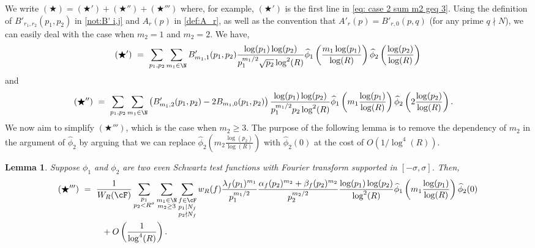 \documentclass[11pt, reqno]{amsart}
\newtheorem{lemma}[theorem]{Lemma}
\theoremstyle{definition}
\theoremstyle{remark}
\numberwithin{equation}{section}
\renewcommand{\hat}{\widehat}
\begin{document}
We write $(\bigstar)=(\bigstar')+(\bigstar'')+(\bigstar''')$ where, for example, $(\bigstar')$ is the first line in \eqref{eq: case 2 sum m2 geq 3}. Using the definition of $B'_{r_1,r_2}(p_1,p_2)$ in \eqref{not:B' i,j} and $A_{r}(p)$ in \eqref{def:A_r}, as well as the convention that $A'_{r}(p) = B'_{r,0}(p,q)$ (for any prime $q\nmid N$), we can easily deal with the case when $m_2=1$ and $m_2=2$. We have, 
\begin{equation}\label{eq for them case 2, m1 =1}
    (\bigstar') \ =\  \sum_{p_1,p_2}\sum_{m_1\in \N} B'_{m_1,1}(p_1,p_2) \frac{\log(p_1)\log(p_2)}{p_1^{m_1/2}\sqrt{p_2}\log^2(R)} \hat\phi_1\left(\frac{m_1\log(p_1)}{\log(R)}\right)\hat\phi_2\left(\frac{\log(p_2)}{\log(R)}\right)
\end{equation} 
and
\begin{align}\label{eq for them case 2, m1 =2}
    (\bigstar'') &\ = \  \sum_{p_1,p_2}\sum_{m_1\in \N} \left(B'_{m_1,2}(p_1,p_2)-2B_{m_1,0}(p_1,p_2)\right)\frac{\log(p_1)\log(p_2)}{p_1^{m_1/2}p_2\log^2(R)} \hat\phi_1\left(m_1\frac{\log(p_1)}{\log(R)}\right)\hat\phi_2\left(2\frac{\log(p_2)}{\log(R)}\right).
\end{align}
We now aim to simplify $(\bigstar''')$, which is the case when $m_2 \geq 3$. The purpose of the following lemma is to remove the dependency of $m_2$ in the argument of $\hat\phi_2$ by arguing that we can replace $\hat\phi_2\left(m_2\frac{\log(p_2)}{\log(R)}\right)$ with $\hat\phi_2(0)$ at the cost of $O\left(1/\log^4(R)\right)$.
\begin{lemma} \label{lemma for case 2} Suppose $\phi_1$ and $\phi_2$ are two even Schwartz test functions with Fourier transform supported in $[-\sigma,\sigma]$. Then,
\small\begin{align}
    (\bigstar''')\ &=\ \frac{1}{W_R(\cF)}\sum_{\substack{p_1\\ p_2 < R^{\sigma}}}\sum_{\substack{m_1\in \N\\m_2\geq 3}}\sum_{\substack{f\in \cF\\p_1|N_f\\p_2\nmid N_f }}w_R(f)\frac{\lambda_f(p_1)^{m_1}}{p_1^{m_1/2}}\frac{\alpha_f(p_2)^{m_2}+\beta_f(p_2)^{m_2}}{p_2^{m_2/2}} \frac{\log(p_1)\log (p_2)}{\log^2(R)}\hat\phi_1 \left(m_1 \frac{\log(p_1)}{\log(R)}\right)\hat \phi_2 (0)\notag \\ & \ \qquad+ O\left(\frac{1}{\log^4(R)}\right).
\end{align}\normalsize
\end{lemma}
\end{document}
